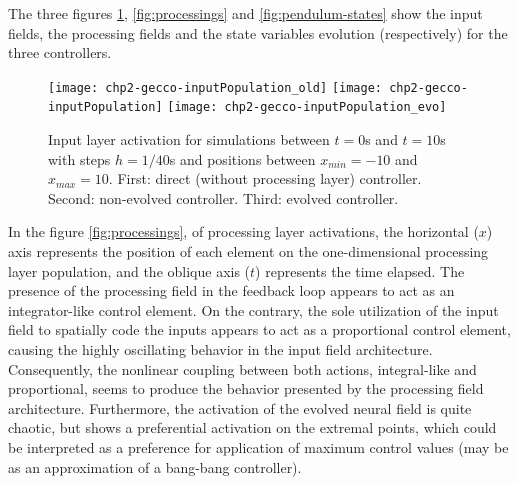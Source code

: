 The three figures \ref{fig:inputs}, \ref{fig:processings} and
\ref{fig:pendulum-states} show the input fields, the processing fields
and the state variables evolution (respectively) for the three
controllers.

\begin{figure} [p]
  \centering
  \texttt{[image: chp2-gecco-inputPopulation\_old]}
  \texttt{[image: chp2-gecco-inputPopulation]}
  \texttt{[image: chp2-gecco-inputPopulation\_evo]}
  \caption{Input layer activation for simulations between $t=0$s and
    $t=10$s with steps $h=1/40$s and positions between $x_{min}=-10$
    and $x_{max}=10$. First: direct (without processing layer)
    controller. Second: non-evolved controller. Third: evolved
    controller.}
  \label{fig:inputs}
\end{figure}

In the figure \ref{fig:processings}, of processing layer activations,
the horizontal ($x$) axis represents the position of each element on
the one-dimensional processing layer population, and the oblique axis
($t$) represents the time elapsed. The presence of the processing
field in the feedback loop appears to act as an integrator-like
control element. On the contrary, the sole utilization of the input
field to spatially code the inputs appears to act as a proportional
control element, causing the highly oscillating behavior in the input
field architecture. Consequently, the nonlinear coupling between both
actions, integral-like and proportional, seems to produce the behavior
presented by the processing field architecture. Furthermore, the
activation of the evolved neural field is quite chaotic, but shows a
preferential activation on the extremal points, which could be
interpreted as a preference for application of maximum control values
(may be as an approximation of a bang-bang controller).


